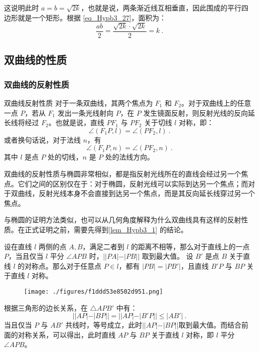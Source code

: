 这说明此时 $a = b = \sqrt{2k}$，也就是说，两条渐近线互相垂直，因此围成的平行四边形就是一个矩形。根据 \autoref{eq_Hypb3_27}，面积为：
\begin{equation}
\frac{ab}{2} = \frac{\sqrt{2k} \cdot \sqrt{2k}}{2} = k~.
\end{equation}

\subsection{双曲线的性质}

\subsubsection{双曲线的反射性质}

\begin{theorem}{双曲线反射性质}
对于一条双曲线，其两个焦点为 $F_1$ 和 $F_2$。对于双曲线上的任意一点 $P$，若从 $F_1$ 发出一条光线射向 $P$，在 $P$ 发生镜面反射，则反射光线的反向延长线将经过 $F_2$。也就是说，直线 $PF_1$ 与 $PF_2$ 关于切线 $l$ 对称，即：
\begin{equation}
\angle(F_1P, l) = \angle(PF_2, l)~.
\end{equation}
或者换句话说，对于法线 $n$，有
\begin{equation}
\angle(F_1P, n) = \angle(PF_2, n)~.
\end{equation}
其中 $l$ 是点 $P$ 处的切线，$n$ 是 $P$ 处的法线方向。
\end{theorem}

双曲线的反射性质与椭圆非常相似，都是指反射光线所在的直线会经过另一个焦点。它们之间的区别仅在于：对于椭圆，反射光线可以实际到达另一个焦点；而对于双曲线，反射光线本身不会直接到达另一个焦点，而是其反向延长线穿过另一个焦点。

与椭圆的证明方法类似，也可以从几何角度解释为什么双曲线具有这样的反射性质。在正式证明之前，需要先得到\autoref{lem_Hypb3_1} 的结论。

\begin{lemma}{设在直线 $l$ 两侧的点 $A,B$，满足二者到 $l$ 的距离不相等，那么对于直线上的一点 $P$，当且仅当 $l$ 平分 $\angle APB$ 时，$||PA|-|PB||$ 取到最大值。}\label{lem_Hypb3_1}
设 $B'$ 是点 $B$ 关于直线 $l$ 的对称点。那么对于任意点 $P \in l$，都有 $|PB| = |PB'|$，且直线 $B'P$ 与 $BP$ 关于直线 $l$ 对称。

\begin{figure}[ht]
\centering
\texttt{[image: ./figures/f1ddd53e8502d951.png]}
\caption{} \label{fig_Hypb3_10}
\end{figure}

根据三角形的边长关系，在 $\triangle APB'$ 中有：
\begin{equation}
||AP|-|BP||=||AP|-|B'P||\leq|AB'|~.
\end{equation}
当且仅当 $P$ 与 $AB'$ 共线时，等号成立，此时$||AP|-|BP||$取到最大值。而结合前面的对称关系，可以得出，此时直线 $AP$ 与 $BP$ 关于直线 $l$ 对称，即 $l$ 平分 $\angle APB$。
\end{lemma}

